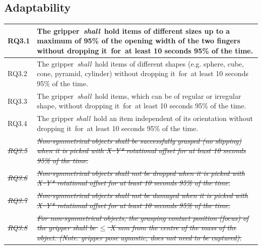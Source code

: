 \documentclass[lettersize,journal]{IEEEtran}
\begin{document}
\subsection{Adaptability} \label{adaptability}
\begin{center}
	\begin{tabular}{|p{7mm}|p{72mm}|}
		\hline
RQ3.1 & The gripper \emph{shall} hold items of different sizes up to a maximum of 95\% of the opening width of the two fingers without dropping it for at least 10 seconds 95\% of the time. \\
\hline
RQ3.2 & The gripper \emph{shall} hold items of different shapes (e.g. sphere, cube, cone, pyramid, cylinder) without dropping it for at least 10 seconds 95\% of the time. \\
\hline
RQ3.3 & The gripper \emph{shall} hold items, which can be of regular or irregular shape, without dropping it for at least 10 seconds 95\% of the time. \\ 
\hline
RQ3.4 & The gripper \emph{shall} hold an item independent of its orientation without dropping it for at least 10 seconds 95\% of the time. \\ 	 
\hline
\emph{\sout{RQ3.5}} & \emph{\sout{Non-symmetrical objects \emph{shall} be successfully grasped (no slipping) when it is picked with X–Y* rotational offset for at least 10 seconds 95\% of the time.}}  \\ 
\hline
\emph{\sout{RQ3.6}} & \emph{\sout{Non-symmetrical objects \emph{shall} not be dropped when it is picked with X–Y* rotational offset for at least 10 seconds 95\% of the time.}}\\
\hline
\emph{\sout{RQ3.7}} & \emph{\sout{Non-symmetrical objects \emph{shall} not be damaged when it is picked with X–Y* rotational offset for at least 10 seconds 95\% of the time.}}\\
\hline
\emph{\sout{RQ3.8}} & \emph{\sout{For non-symmetrical objects, the grasping contact position (focus) of the gripper \emph{shall} be $\le$ X mm from the centre of the mass of the object. (Note: gripper pose agnostic, does not need to be captured).}}\\	[1ex] 
\hline
	\end{tabular}
\end{center}
\end{document}
